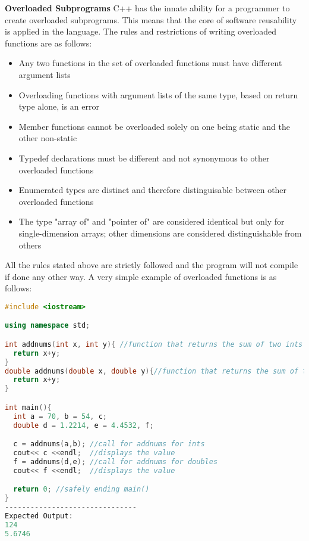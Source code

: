 \documentclass[12pt]{article}
\begin{document}
\textbf{Overloaded Subprograms} C++ has the innate ability for a programmer to create overloaded subprograms. This means that the core of software reusability is applied in the language. The rules and restrictions of writing overloaded functions are as follows:
\begin{itemize}
  \item Any two functions in the set of overloaded functions must have different argument lists
  \item Overloading functions with argument lists of the same type, based on return type alone, is an error
  \item Member functions cannot be overloaded solely on one being static and the other non-static
  \item Typedef declarations must be different and not synonymous to other overloaded functions
  \item Enumerated types are distinct and therefore distinguisable between other overloaded functions
  \item The type "array of" and "pointer of" are considered identical but only for single-dimension arrays; other dimensions are considered distinguishable from others 
\end{itemize}

All the rules stated above are strictly followed and the program will not compile if done any other way. A very simple example of overloaded functions is as follows:
\begin{lstlisting}[language=C++]
  #include <iostream>

using namespace std;

int addnums(int x, int y){ //function that returns the sum of two ints
  return x+y;
}
double addnums(double x, double y){//function that returns the sum of two doubles
  return x+y;
}

int main(){
  int a = 70, b = 54, c;
  double d = 1.2214, e = 4.4532, f;

  c = addnums(a,b); //call for addnums for ints
  cout<< c <<endl;  //displays the value
  f = addnums(d,e); //call for addnums for doubles
  cout<< f <<endl;  //displays the value

  return 0; //safely ending main()
}
-------------------------------
Expected Output:
124
5.6746
\end{lstlisting}
\end{document}
